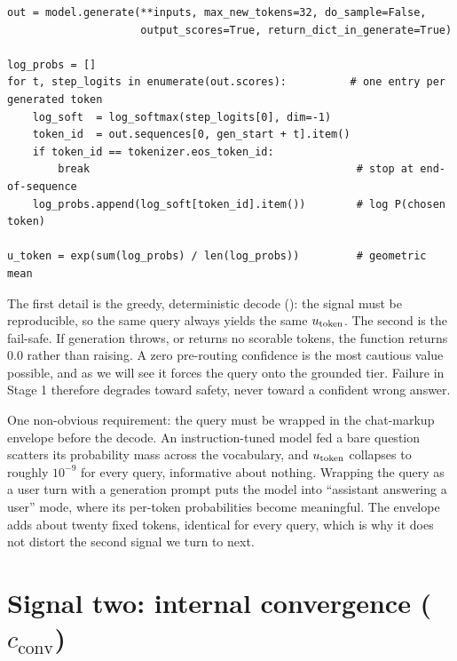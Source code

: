 \begin{lstlisting}[caption={The $u_{\text{token}}$ computation, condensed from \texttt{caem/confidence/pre\_routing.py}.}, label={lst:utoken}]
out = model.generate(**inputs, max_new_tokens=32, do_sample=False,
                     output_scores=True, return_dict_in_generate=True)

log_probs = []
for t, step_logits in enumerate(out.scores):          # one entry per generated token
    log_soft  = log_softmax(step_logits[0], dim=-1)
    token_id  = out.sequences[0, gen_start + t].item()
    if token_id == tokenizer.eos_token_id:
        break                                          # stop at end-of-sequence
    log_probs.append(log_soft[token_id].item())        # log P(chosen token)

u_token = exp(sum(log_probs) / len(log_probs))         # geometric mean
\end{lstlisting}

The first detail is the greedy, deterministic decode ():
the signal must be reproducible, so the same query always yields the same
$u_{\text{token}}$. The second is the fail-safe. If generation throws, or returns no
scorable tokens, the function returns $0.0$ rather than raising. A zero
pre-routing confidence is the most cautious value possible, and as we will see it
forces the query onto the grounded tier. Failure in Stage 1 therefore degrades
toward safety, never toward a confident wrong answer.

\begin{pitfall}
One non-obvious requirement: the query must be wrapped in the chat-markup envelope
before the decode. An instruction-tuned model fed a bare question scatters its
probability mass across the vocabulary, and $u_{\text{token}}$ collapses to roughly
$10^{-9}$ for every query, informative about nothing. Wrapping the query as a user
turn with a generation prompt puts the model into ``assistant answering a user''
mode, where its per-token probabilities become meaningful. The envelope adds about
twenty fixed tokens, identical for every query, which is why it does not distort
the second signal we turn to next.
\end{pitfall}

\section{Signal two: internal convergence ($c_{\text{conv}}$)}
\label{sec:upre-cconv}

